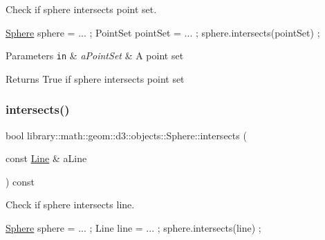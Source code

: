 Check if sphere intersects point set. 


\begin{DoxyCode}
\hyperlink{classlibrary_1_1math_1_1geom_1_1d3_1_1objects_1_1_sphere_a55dccc8ea16ee55cd7694c26afa8ea39}{Sphere} sphere = ... ;
PointSet pointSet = ... ;
sphere.intersects(pointSet) ;
\end{DoxyCode}



\begin{DoxyParams}[1]{Parameters}
\mbox{\tt in}  & {\em a\+Point\+Set} & A point set \\
\hline
\end{DoxyParams}
\begin{DoxyReturn}{Returns}
True if sphere intersects point set 
\end{DoxyReturn}
\mbox{\label{classlibrary_1_1math_1_1geom_1_1d3_1_1objects_1_1_sphere_a3740a954ea02ce23ff121a92f8902d92}} 
\subsubsection{\texorpdfstring{intersects()}{intersects()}\hspace{0.1cm}{\footnotesize\ttfamily [3/9]}}
{\footnotesize\ttfamily bool library\+::math\+::geom\+::d3\+::objects\+::\+Sphere\+::intersects (\begin{DoxyParamCaption}\item[{const \hyperlink{classlibrary_1_1math_1_1geom_1_1d3_1_1objects_1_1_line}{Line} \&}]{a\+Line }\end{DoxyParamCaption}) const}



Check if sphere intersects line. 


\begin{DoxyCode}
\hyperlink{classlibrary_1_1math_1_1geom_1_1d3_1_1objects_1_1_sphere_a55dccc8ea16ee55cd7694c26afa8ea39}{Sphere} sphere = ... ;
Line line = ... ;
sphere.intersects(line) ;
\end{DoxyCode}



